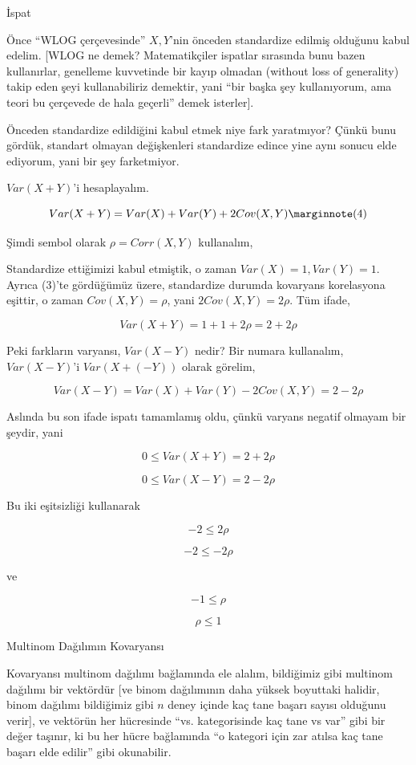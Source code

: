 \documentclass[12pt,fleqn]{article}\usepackage{../../common}
\begin{document}
İspat

Önce ``WLOG çerçevesinde'' $X,Y$'nin önceden standardize edilmiş olduğunu
kabul edelim. [WLOG ne demek? Matematikçiler ispatlar sırasında bunu bazen
kullanırlar, genelleme kuvvetinde bir kayıp olmadan (without loss of
generality) takip eden şeyi kullanabiliriz demektir, yani ``bir başka şey
kullanıyorum, ama teori bu çerçevede de hala geçerli'' demek isterler]. 

Önceden standardize edildiğini kabul etmek niye fark yaratmıyor? Çünkü bunu
gördük, standart olmayan değişkenleri standardize edince yine aynı sonucu
elde ediyorum, yani bir şey farketmiyor. 

$Var(X+Y)$'i hesaplayalım. 

$$ Var(X+Y) = Var(X) + Var(Y) + 2Cov(X,Y) 
\mlabel{4}
$$

Şimdi sembol olarak $\rho = Corr(X,Y)$ kullanalım,

Standardize ettiğimizi kabul etmiştik, o zaman $Var(X)=1,Var(Y)=1$. Ayrıca
(3)'te gördüğümüz üzere, standardize durumda kovaryans korelasyona eşittir,
o zaman $Cov(X,Y)=\rho$, yani $2Cov(X,Y) = 2\rho$. Tüm ifade,

$$ Var(X+Y) = 1 + 1 + 2 \rho  = 2 + 2\rho$$

Peki farkların varyansı, $Var(X-Y)$ nedir? Bir numara kullanalım,
$Var(X-Y)$'i $Var(X+(-Y))$ olarak görelim, 

$$ Var(X-Y) = Var(X) + Var(Y) - 2Cov(X,Y) = 2 - 2\rho $$

Aslında bu son ifade ispatı tamamlamış oldu, çünkü varyans negatif olmayam
bir şeydir, yani 

$$ 0 \le Var(X+Y) = 2 + 2\rho$$

$$ 0 \le Var(X-Y) = 2 - 2\rho$$

Bu iki eşitsizliği kullanarak 

$$ -2 \le 2\rho$$

$$ -2 \le - 2\rho$$

ve 

$$ -1 \le \rho$$

$$ \rho \le 1 $$

Multinom Dağılımın Kovaryansı

Kovaryansı multinom dağılımı bağlamında ele alalım, bildiğimiz gibi
multinom dağılımı bir vektördür [ve binom dağılımının daha yüksek boyuttaki
halidir, binom dağılımı bildiğimiz gibi $n$ deney içinde kaç tane başarı
sayısı olduğunu verir], ve vektörün her hücresinde ``vs. kategorisinde kaç
tane vs var'' gibi bir değer taşınır, ki bu her hücre bağlamında ``o
kategori için zar atılsa kaç tane başarı elde edilir'' gibi okunabilir. 
\end{document}
